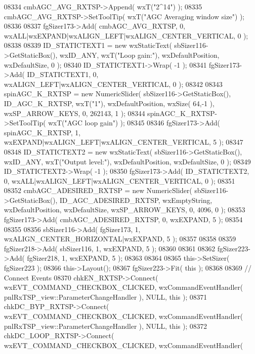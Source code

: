 \begin{DoxyCode}
08334     cmbAGC_AVG_RXTSP->Append( wxT(\textcolor{stringliteral}{"2^14"}) );
08335     cmbAGC_AVG_RXTSP->SetToolTip( wxT(\textcolor{stringliteral}{"AGC Averaging window size"}) );
08336     
08337     fgSizer173->Add( cmbAGC_AVG_RXTSP, 0, wxALL|wxEXPAND|wxALIGN\_LEFT|wxALIGN\_CENTER\_VERTICAL, 0 );
08338     
08339     ID_STATICTEXT1 = \textcolor{keyword}{new} wxStaticText( sbSizer116->GetStaticBox(), wxID\_ANY, wxT(\textcolor{stringliteral}{"Loop gain:"}), 
      wxDefaultPosition, wxDefaultSize, 0 );
08340     ID_STATICTEXT1->Wrap( -1 );
08341     fgSizer173->Add( ID_STATICTEXT1, 0, wxALIGN\_LEFT|wxALIGN\_CENTER\_VERTICAL, 0 );
08342     
08343     spinAGC_K_RXTSP = \textcolor{keyword}{new} NumericSlider( sbSizer116->GetStaticBox(), 
      ID_AGC_K_RXTSP, wxT(\textcolor{stringliteral}{"1"}), wxDefaultPosition, wxSize( 64,-1 ), wxSP\_ARROW\_KEYS, 0, 262143, 1 );
08344     spinAGC_K_RXTSP->SetToolTip( wxT(\textcolor{stringliteral}{"AGC loop gain"}) );
08345     
08346     fgSizer173->Add( spinAGC_K_RXTSP, 1, wxEXPAND|wxALIGN\_LEFT|wxALIGN\_CENTER\_VERTICAL, 5 );
08347     
08348     ID_STATICTEXT2 = \textcolor{keyword}{new} wxStaticText( sbSizer116->GetStaticBox(), wxID\_ANY, wxT(\textcolor{stringliteral}{"Output level:"}), 
      wxDefaultPosition, wxDefaultSize, 0 );
08349     ID_STATICTEXT2->Wrap( -1 );
08350     fgSizer173->Add( ID_STATICTEXT2, 0, wxALL|wxALIGN\_LEFT|wxALIGN\_CENTER\_VERTICAL, 0 );
08351     
08352     cmbAGC_ADESIRED_RXTSP = \textcolor{keyword}{new} NumericSlider( sbSizer116->GetStaticBox(), 
      ID_AGC_ADESIRED_RXTSP, wxEmptyString, wxDefaultPosition, wxDefaultSize, wxSP\_ARROW\_KEYS, 0, 4096, 0 );
08353     fgSizer173->Add( cmbAGC_ADESIRED_RXTSP, 0, wxEXPAND, 5 );
08354     
08355     
08356     sbSizer116->Add( fgSizer173, 1, wxALIGN\_CENTER\_HORIZONTAL|wxEXPAND, 5 );
08357     
08358     
08359     fgSizer218->Add( sbSizer116, 1, wxEXPAND, 5 );
08360     
08361     
08362     fgSizer223->Add( fgSizer218, 1, wxEXPAND, 5 );
08363     
08364     
08365     this->SetSizer( fgSizer223 );
08366     this->Layout();
08367     fgSizer223->Fit( \textcolor{keyword}{this} );
08368     
08369     \textcolor{comment}{// Connect Events}
08370     chkEN_RXTSP->Connect( wxEVT\_COMMAND\_CHECKBOX\_CLICKED, wxCommandEventHandler( 
      pnlRxTSP_view::ParameterChangeHandler ), NULL, \textcolor{keyword}{this} );
08371     chkDC_BYP_RXTSP->Connect( wxEVT\_COMMAND\_CHECKBOX\_CLICKED, wxCommandEventHandler( 
      pnlRxTSP_view::ParameterChangeHandler ), NULL, \textcolor{keyword}{this} );
08372     chkDC_LOOP_RXTSP->Connect( wxEVT\_COMMAND\_CHECKBOX\_CLICKED, wxCommandEventHandler( 

\end{DoxyCode}

